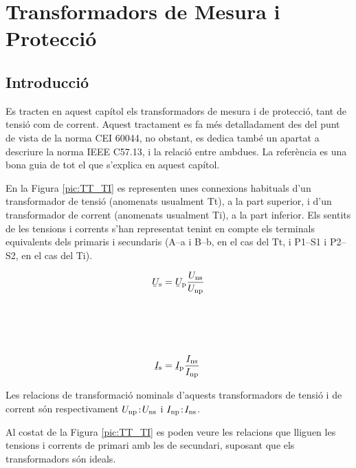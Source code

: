 \chapter{Transformadors de Mesura i Protecció}\label{sec:tr_mes_prot}


\section{Introducció}
Es tracten en aquest capítol els transformadors de
mesura i de protecció, tant de tensió com de corrent. Aquest
tractament es fa més detalladament des del punt de vista de la norma CEI 60044, no obstant, es dedica també un
apartat a descriure la norma  IEEE C57.13, i la
relació entre ambdues. La referència \cite{KNU} es una bona guia de tot el que s'explica en aquest capítol.

En la Figura \vref{pic:TT_TI} es representen unes connexions
habituals d'un transformador de tensió (anomenats usualment Tt), a
la part superior, i d'un transformador de corrent (anomenats
usualment Ti), a la part inferior. Els sentits de les tensions
i corrents s'han representat tenint en compte els terminals
equivalents dels primaris i secundaris (\textsf{A--a} i \textsf{B--b}, en el cas del Tt, i \textsf{P1--S1} i \textsf{P2--S2}, en el cas del Ti).

\hfill
\begin{minipage}[b]{90mm}
    \hspace{1.5cm}
    
    \label{pic:TT_TI}
\end{minipage}
\hfill
\begin{minipage}[b][70mm][t]{50mm}
   \begin{align}
      \cmplx{U}\ped{s} &= \cmplx{U}\ped{p} \frac{U\ped{ns}}{U\ped{np}}
      \\[21mm]
      \cmplx{I}\ped{s} &= \cmplx{I}\ped{p} \frac{I\ped{ns}}{I\ped{np}}
   \end{align}
\end{minipage}

Les relacions de transformació nominals d'aquests transformadors de
tensió i de corrent són respectivament $U_\mathrm{np}\!:\!U_\mathrm{ns}$ i
$I_\mathrm{np}\!:\!I_\mathrm{ns}$.

Al costat de la Figura
\vref{pic:TT_TI} es poden veure les relacions que lliguen les
tensions i corrents de primari amb les de secundari, suposant que
els transformadors són ideals.


